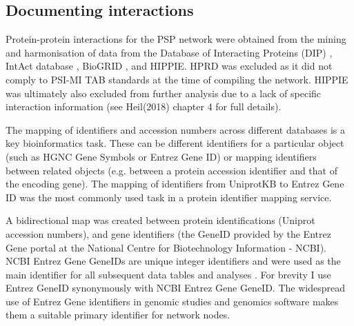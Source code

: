  \subsection{Documenting interactions}
 Protein-protein interactions for the PSP network were obtained from the mining and harmonisation of data from the Database of Interacting Proteins (DIP) \cite{xenarios2002dip},  IntAct database \cite{orchard2014mintact},  BioGRID \cite{chatr2017biogrid}, and HIPPIE\cite{schaefer2012hippie}. HPRD\cite{keshava2009human} was excluded as it did not comply to PSI-MI TAB  standards at the time of compiling the network. HIPPIE was ultimately also excluded from further analysis due to a lack of specific interaction information (see Heil(2018)\cite{heil2018systems} chapter 4 for full details). 
 
 The mapping of identifiers and accession numbers across different databases is a key bioinformatics task\cite{huang2011comprehensive}. These can be different identifiers for a particular object (such as HGNC Gene Symbols or Entrez Gene ID) or mapping identifiers between related objects (e.g. between a protein accession identifier and that of the encoding gene). The mapping of identifiers from UniprotKB to Entrez Gene ID was the most commonly used task in a protein identifier mapping service\cite{huang2011comprehensive}.
 
 A bidirectional map was created between protein identifications (Uniprot accession numbers\cite{uniprot2017uniprot}), and gene identifiers (the GeneID provided by the Entrez Gene portal at the National Centre for Biotechnology Information - NCBI). NCBI Entrez Gene GeneIDs are unique integer identifiers and were used as the main identifier for all subsequent data tables and analyses \cite{maglott2005entrez}. For brevity I use Entrez GeneID synonymously with NCBI Entrez Gene GeneID. The widespread use of Entrez Gene identifiers in genomic studies and genomics software \cite{huang2011comprehensive} makes them a suitable primary identifier for network nodes.


